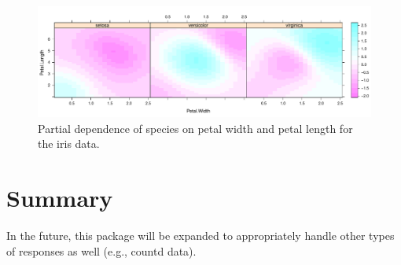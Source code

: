 \begin{figure}[htbp]
  \centering
  \includegraphics[width=1.0\linewidth]{partial_iris}
  \caption{Partial dependence of species on petal width and petal length for the iris data.}
  \label{fig:partial_iris}
\end{figure}

\section{Summary}

In the future, this package will be expanded to appropriately handle other types of responses as well (e.g., countd data).



\address{Brandon Greenwell\\
  Infoscitex, a dcs company\\
  4027 Colonel Glenn Highway\\
  Suite 210\\
  Dayton, OH 45431-1672\\
  United States of America\\}
 